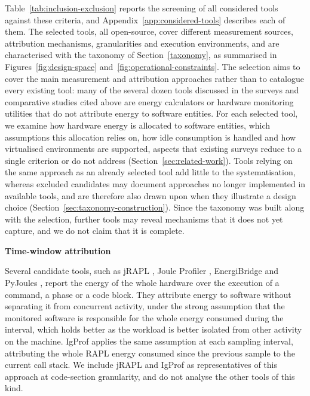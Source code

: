 \documentclass[
  acmsmall,
  screen,
  review,
  xcolor={dvipsnames,usenames}
]{acmart}
\begin{document}
Table~\ref{tab:inclusion-exclusion} reports the screening of all considered tools against these criteria, and Appendix~\ref{app:considered-tools} describes each of them. The selected tools, all open-source, cover different measurement sources, attribution mechanisms, granularities and execution environments, and are characterised with the taxonomy of Section~\ref{taxonomy}, as summarised in Figures~\ref{fig:design-space} and~\ref{fig:operational-constraints}. The selection aims to cover the main measurement and attribution approaches rather than to catalogue every existing tool: many of the several dozen tools discussed in the surveys and comparative studies cited above are energy calculators or hardware monitoring utilities that do not attribute energy to software entities. For each selected tool, we examine how hardware energy is allocated to software entities, which assumptions this allocation relies on, how idle consumption is handled and how virtualised environments are supported, aspects that existing surveys reduce to a single criterion or do not address (Section~\ref{sec:related-work}). Tools relying on the same approach as an already selected tool add little to the systematisation, whereas excluded candidates may document approaches no longer implemented in available tools, and are therefore also drawn upon when they illustrate a design choice (Section~\ref{sec:taxonomy-construction}). Since the taxonomy was built along with the selection, further tools may reveal mechanisms that it does not yet capture, and we do not claim that it is complete.

\textbf{Time-window attribution}

Several candidate tools, such as jRAPL \cite{liuDataOrientedCharacterizationApplicationLevel2015}, Joule Profiler \cite{woirhayeJouleProfilerPhasebased2026}, EnergiBridge \cite{aneggiMeasuringSoftwareEnergy2026} and PyJoules \cite{pathaniaCalculatingSoftwaresEnergy2025}, report the energy of the whole hardware over the execution of a command, a phase or a code block. They attribute energy to software without separating it from concurrent activity, under the strong assumption that the monitored software is responsible for the whole energy consumed during the interval, which holds better as the workload is better isolated from other activity on the machine. IgProf \cite{khanEnergyProfilingUsing2015} applies the same assumption at each sampling interval, attributing the whole RAPL energy consumed since the previous sample to the current call stack. We include jRAPL and IgProf as representatives of this approach at code-section granularity, and do not analyse the other tools of this kind.
\end{document}
